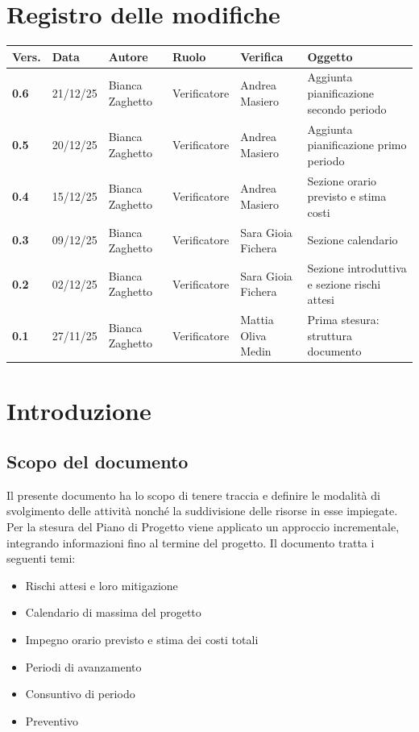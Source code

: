 \documentclass[a4paper,12pt]{article}
\begin{document}


\newpage
\section*{Registro delle modifiche}

\begin{table}[h!]
\begin{tabularx}{\textwidth}{|l|l|l|l|L|L|}
\hline
\textbf{Vers.} & \textbf{Data} & \textbf{Autore} & \textbf{Ruolo} & \textbf{Verifica} & \textbf{Oggetto} \\
\hline
\textbf{0.6} & 21/12/25 & Bianca Zaghetto & Verificatore & Andrea Masiero & Aggiunta pianificazione secondo periodo \\
\hline
\textbf{0.5} & 20/12/25 & Bianca Zaghetto & Verificatore & Andrea Masiero & Aggiunta pianificazione primo periodo \\
\hline
\textbf{0.4} & 15/12/25 & Bianca Zaghetto & Verificatore & Andrea Masiero & Sezione orario previsto e stima costi \\
\hline
\textbf{0.3} & 09/12/25 & Bianca Zaghetto & Verificatore & Sara Gioia Fichera & Sezione calendario \\
\hline
\textbf{0.2} & 02/12/25 & Bianca Zaghetto & Verificatore & Sara Gioia Fichera & Sezione introduttiva e sezione rischi attesi \\
\hline
\textbf{0.1} & 27/11/25 & Bianca Zaghetto & Verificatore & Mattia Oliva Medin & Prima stesura: struttura documento \\
\hline
\end{tabularx}
\end{table}

\newpage
\tableofcontents

\newpage
\listoffigures

\newpage
\listoftables

\newpage

\section{Introduzione}
    \subsection{Scopo del documento}
        Il presente documento ha lo scopo di tenere traccia e definire le modalità di svolgimento delle attività nonché la suddivisione delle risorse in esse impiegate.
        Per la stesura del Piano di Progetto viene applicato un approccio incrementale, integrando informazioni fino al termine del progetto. Il documento tratta i seguenti temi:
        \begin{itemize}
            \item Rischi attesi e loro mitigazione
            \item Calendario di massima del progetto
            \item Impegno orario previsto e stima dei costi totali
            \item Periodi di avanzamento
            \item Consuntivo di periodo
            \item Preventivo
        \end{itemize}
\end{document}
